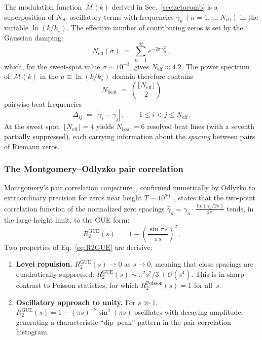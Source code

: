 \documentclass[12pt,a4paper]{article}
\begin{document}
The modulation function~$\mathcal{M}(k)$ derived in
Sec.~\ref{sec:zetacomb} is a superposition of
$N_{\mathrm{eff}}$ oscillatory terms with frequencies
$\gamma_n\,(n=1,\dots,N_{\mathrm{eff}})$ in the variable
$\ln(k/k_\star)$.  The effective number of contributing zeros
is set by the Gaussian damping:
\begin{equation}\label{eq:Neff}
  N_{\mathrm{eff}}(\sigma)
  \;=\;
  \sum_{n=1}^{\infty} e^{-2\sigma\,\gamma_n^2}\,,
\end{equation}
which, for the sweet-spot value $\sigma\sim 10^{-3}$,
gives $N_{\mathrm{eff}}\approx 4.2$.
The power spectrum of~$\mathcal{M}(k)$ in the
$u\equiv\ln(k/k_\star)$ domain therefore contains
\begin{equation}\label{eq:Nbeat}
  N_{\mathrm{beat}}
  \;=\;
  \binom{\lfloor N_{\mathrm{eff}}\rfloor}{2}
\end{equation}
pairwise beat frequencies
\begin{equation}\label{eq:deltaij}
  \Delta_{ij} \;=\; |\gamma_i - \gamma_j|\,,
  \qquad 1\le i < j \le N_{\mathrm{eff}}\,.
\end{equation}
At the sweet spot, $\lfloor N_{\mathrm{eff}}\rfloor = 4$
yields $N_{\mathrm{beat}}=6$ resolved beat lines
(with a seventh partially suppressed),
each carrying information about the \emph{spacing}
between pairs of Riemann zeros.

\subsubsection{The Montgomery--Odlyzko pair correlation}

Montgomery's pair correlation conjecture~\cite{Montgomery1973},
confirmed numerically by Odlyzko to extraordinary precision
for zeros near height $T\sim 10^{20}$~\cite{Odlyzko1987,Odlyzko2001},
states that the two-point correlation function of the
normalized zero spacings $\hat\gamma_n = \gamma_n\cdot
\frac{\ln(\gamma_n/2\pi)}{2\pi}$
tends, in the large-height limit, to the GUE form:
\begin{equation}\label{eq:R2GUE}
  R_2^{\mathrm{GUE}}(s)
  \;=\;
  1 - \left(\frac{\sin\pi s}{\pi s}\right)^{\!2}\,.
\end{equation}
Two properties of Eq.~\eqref{eq:R2GUE} are decisive:
\begin{enumerate}
\item \textbf{Level repulsion.}\;
  $R_2^{\mathrm{GUE}}(s)\to 0$ as $s\to 0$,
  meaning that close spacings are quadratically suppressed:
  $R_2^{\mathrm{GUE}}(s) \sim \pi^2 s^2/3 + \mathcal{O}(s^4)$.
  This is in sharp contrast to Poisson statistics,
  for which $R_2^{\mathrm{Poisson}}(s) = 1$ for all~$s$.

\item \textbf{Oscillatory approach to unity.}\;
  For $s\gg 1$, $R_2^{\mathrm{GUE}}(s)=1-(\pi s)^{-2}\sin^2(\pi s)$
  oscillates with decaying amplitude, generating a
  characteristic ``dip--peak'' pattern in the
  pair-correlation histogram.
\end{enumerate}
\end{document}
